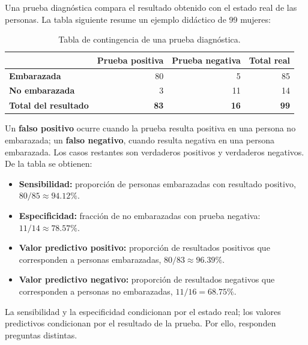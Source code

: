 Una prueba diagnóstica compara el resultado obtenido con el estado real de las personas. La tabla siguiente resume un ejemplo didáctico de 99 mujeres:

\begin{table}[H]
\centering
\small
\renewcommand{\arraystretch}{1.15}
\begin{tabular}{|l|r|r|r|}
\hline
 & \textbf{Prueba positiva} & \textbf{Prueba negativa} & \textbf{Total real} \\ \hline
\textbf{Embarazada} & 80 & 5 & 85 \\ \hline
\textbf{No embarazada} & 3 & 11 & 14 \\ \hline
\textbf{Total del resultado} & \textbf{83} & \textbf{16} & \textbf{99} \\ \hline
\end{tabular}
\caption{Tabla de contingencia de una prueba diagnóstica.}
\label{tab:prueba-diagnostica}
\end{table}

Un \textbf{falso positivo} ocurre cuando la prueba resulta positiva en una persona no embarazada; un \textbf{falso negativo}, cuando resulta negativa en una persona embarazada. Los casos restantes son verdaderos positivos y verdaderos negativos. De la tabla se obtienen:

\begin{itemize}
    \item \textbf{Sensibilidad:} proporción de personas embarazadas con resultado positivo, $80/85\approx94.12\%$.
    \item \textbf{Especificidad:} fracción de no embarazadas con prueba negativa: $11/14\approx78.57\%$.
    \item \textbf{Valor predictivo positivo:} proporción de resultados positivos que corresponden a personas embarazadas, $80/83\approx96.39\%$.
    \item \textbf{Valor predictivo negativo:} proporción de resultados negativos que corresponden a personas no embarazadas, $11/16=68.75\%$.
\end{itemize}

La sensibilidad y la especificidad condicionan por el estado real; los valores predictivos condicionan por el resultado de la prueba. Por ello, responden preguntas distintas.